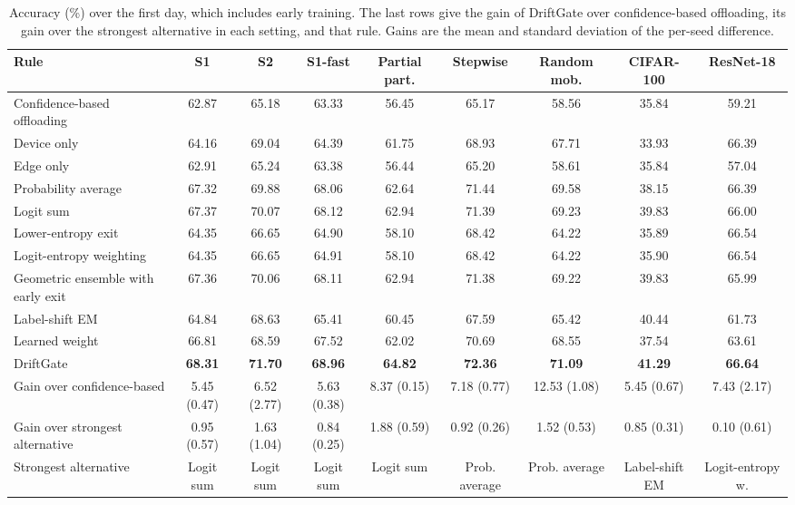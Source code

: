 \begin{table}[t]
\centering
\caption{Accuracy (\%) over the first day, which includes early training. The last rows give the gain of DriftGate over confidence-based offloading, its gain over the strongest alternative in each setting, and that rule. Gains are the mean and standard deviation of the per-seed difference.}
\label{tab:main}
\begin{adjustbox}{max width=\textwidth}
\begin{tabular}{lcccccccc}
\toprule
Rule & S1 & S2 & S1-fast & Partial part. & Stepwise & Random mob. & CIFAR-100 & ResNet-18 \\
\midrule
Confidence-based offloading & 62.87 & 65.18 & 63.33 & 56.45 & 65.17 & 58.56 & 35.84 & 59.21 \\
Device only & 64.16 & 69.04 & 64.39 & 61.75 & 68.93 & 67.71 & 33.93 & 66.39 \\
Edge only & 62.91 & 65.24 & 63.38 & 56.44 & 65.20 & 58.61 & 35.84 & 57.04 \\
Probability average & 67.32 & 69.88 & 68.06 & 62.64 & 71.44 & 69.58 & 38.15 & 66.39 \\
Logit sum & 67.37 & 70.07 & 68.12 & 62.94 & 71.39 & 69.23 & 39.83 & 66.00 \\
Lower-entropy exit & 64.35 & 66.65 & 64.90 & 58.10 & 68.42 & 64.22 & 35.89 & 66.54 \\
Logit-entropy weighting & 64.35 & 66.65 & 64.91 & 58.10 & 68.42 & 64.22 & 35.90 & 66.54 \\
Geometric ensemble with early exit & 67.36 & 70.06 & 68.11 & 62.94 & 71.38 & 69.22 & 39.83 & 65.99 \\
Label-shift EM & 64.84 & 68.63 & 65.41 & 60.45 & 67.59 & 65.42 & 40.44 & 61.73 \\
Learned weight & 66.81 & 68.59 & 67.52 & 62.02 & 70.69 & 68.55 & 37.54 & 63.61 \\
DriftGate & \textbf{68.31} & \textbf{71.70} & \textbf{68.96} & \textbf{64.82} & \textbf{72.36} & \textbf{71.09} & \textbf{41.29} & \textbf{66.64} \\
\midrule
Gain over confidence-based & 5.45 (0.47) & 6.52 (2.77) & 5.63 (0.38) & 8.37 (0.15) & 7.18 (0.77) & 12.53 (1.08) & 5.45 (0.67) & 7.43 (2.17) \\
Gain over strongest alternative & 0.95 (0.57) & 1.63 (1.04) & 0.84 (0.25) & 1.88 (0.59) & 0.92 (0.26) & 1.52 (0.53) & 0.85 (0.31) & 0.10 (0.61) \\
Strongest alternative & Logit sum & Logit sum & Logit sum & Logit sum & Prob. average & Prob. average & Label-shift EM & Logit-entropy w. \\
\bottomrule
\end{tabular}
\end{adjustbox}
\end{table}

